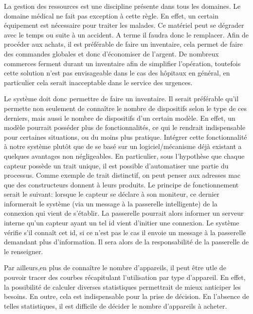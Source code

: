 La gestion des ressources est une discipline présente dans tous les domaines. Le domaine médical ne fait pas exception à cette
règle. En effet, un certain équipement est nécessaire pour traiter les malades. Ce matériel peut se dégrader avec le temps ou
suite à un accident. A terme il faudra donc le remplacer. Afin de procéder aux achats, il est préférable de faire un inventaire,
cela permet de faire des commandes globales et donc d'économiser de l'argent. De nombreux commerces ferment durant un inventaire
afin de simplifier l'opération, toutefois cette solution n'est pas envisageable dans le cas des hôpitaux en général, en
particulier cela serait inacceptable dans le service des urgences.
\newline

Le système doit donc permettre de faire un inventaire. Il serait préférable qu'il permette non seulement de connaître le nombre de
dispositifs selon le type de ces derniers, mais aussi le nombre de dispositifs d'un certain modèle. En effet, un modèle pourrait
posséder plus de fonctionnalités, ce qui le rendrait indispensable pour certaines situations, ou du moins plus pratique. Intégrer
cette fonctionnalité à notre système plutôt que de se basé sur un logiciel/mécanisme déjà existant a quelques avantages
non négligeables. En particulier, sous l'hypothèse que chaque capteur possède un trait unique, il est possible d'automatiser une
partie du processus. Comme exemple de trait distinctif, on peut penser aux adresses mac que des constructeurs donnent à leurs
produits. Le principe de fonctionnement serait le suivant: lorsque le capteur se déclare à son moniteur, ce dernier informerait le
système (via un message à la passerelle intelligente) de la connexion qui vient de s'établir. La passerelle pourrait alors
informer un serveur interne qu'un capteur ayant un tel id vient d'initier une connexion. Le système vérifie s'il connaît cet id,
si ce n'est pas le cas il envoie un message à la passerelle demandant plus d'information. Il sera alors de la responsabilité de la
passerelle de le renseigner.
\newline

Par ailleurs,en plus de connaître le nombre d'appareils, il peut être utle de pouvoir tracer des courbes récapitulant
l'utilisation par type d'appareil. En effet, la possibilité de calculer diverses statistiques permettrait de mieux anticiper les
besoins. En outre, cela est indispensable pour la prise de décision. En l'absence de telles statistiques, il est difficile de
décider le nombre d'appareils à acheter.
